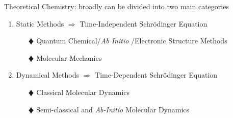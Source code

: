 \documentclass[slidestop,mathserif,compress,xcolor=svgnames]{beamer}
\begin{document}
\begin{frame}
\begin{columns}
\column{11cm}
\begin{block}{Theoretical Chemistry: broadly can be divided into two main categories}
\begin{enumerate}
\item Static Methods {\Large$\Rightarrow$} {\color{blue}Time-Independent Schr\"{o}dinger Equation}
\begin{enumerate}
\item[$\vardiamond$] Quantum Chemical/\emph{Ab Initio} /Electronic Structure Methods
\item[$\vardiamond$] Molecular Mechanics
\end{enumerate}
\item Dynamical Methods {\Large$\Rightarrow$} {\color{blue}Time-Dependent Schr\"{o}dinger Equation}
\begin{enumerate}
\item[$\vardiamond$] Classical Molecular Dynamics
\item[$\vardiamond$] Semi-classical and \textit{Ab-Initio} Molecular Dynamics
\end{enumerate}
\end{enumerate}
\end{block}
\end{columns}

\end{frame}


\end{document}

